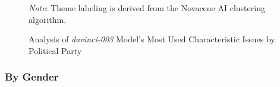 \documentclass{article}
\begin{document}
\begin{figure}[H]
\centering
{}
\caption{Analysis of \textit{davinci-003} Model's Most Used Characteristic Issues by Political Party}
\begin{minipage}{0.7\textwidth}
\footnotesize \textit{Note}: Theme labeling is derived from the Novacene AI clustering algorithm.
\label{byparty}
\end{minipage}
\end{figure}

\subsubsection{By Gender}
\end{document}
